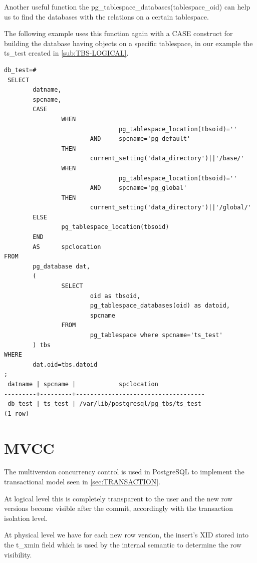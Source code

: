 Another useful function the pg\_tablespace\_databases(tablespace\_oid) can help us to find the databases 
with the relations on a certain tablespace.\newline

The following example uses this function again with a CASE construct for building the database having 
objects on a specific tablespace, in our example the ts\_test created in \ref{sub:TBS-LOGICAL}.\newpage
\begin{lstlisting}[style=pgsql]
 db_test=# 
 SELECT
        datname,
        spcname,
        CASE
                WHEN 
                                pg_tablespace_location(tbsoid)=''
                        AND     spcname='pg_default'
                THEN
                        current_setting('data_directory')||'/base/'
                WHEN 
                                pg_tablespace_location(tbsoid)=''
                        AND     spcname='pg_global'
                THEN
                        current_setting('data_directory')||'/global/'
        ELSE
                pg_tablespace_location(tbsoid)
        END
        AS      spclocation
FROM
        pg_database dat,
        (
                SELECT
                        oid as tbsoid,
                        pg_tablespace_databases(oid) as datoid,
                        spcname 
                FROM 
                        pg_tablespace where spcname='ts_test'
        ) tbs
WHERE
        dat.oid=tbs.datoid
;
 datname | spcname |            spclocation             
---------+---------+------------------------------------
 db_test | ts_test | /var/lib/postgresql/pg_tbs/ts_test
(1 row)

\end{lstlisting}



\section{MVCC} \label{sec:MVCC} 
The multiversion concurrency control is used in PostgreSQL to implement the  transactional model seen in 
\ref{sec:TRANSACTION}.\newline

At logical level this is completely transparent to the user and the new row versions become visible 
after the commit, accordingly with the transaction isolation level. \newline

At physical level we have for each new row version, the insert's XID stored into the t\_xmin field which is 
used by the internal semantic to determine the row visibility. 

